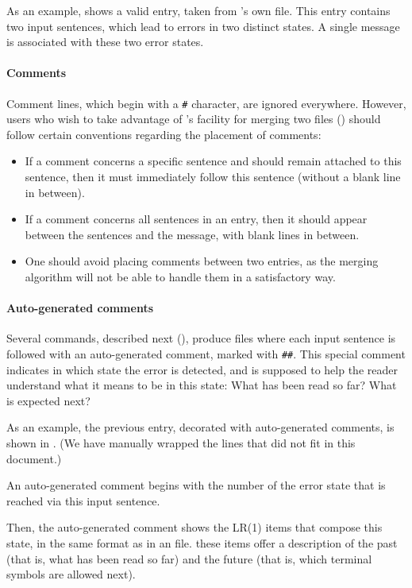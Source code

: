 \documentclass[onecolumn,11pt,nocopyrightspace,preprint]{sigplanconf}
\begin{document}
As an example,  shows a valid entry, taken
from \menhir's own \messages file. This entry contains two input sentences,
which lead to errors in two distinct states. A single message is associated
with these two error states.

\paragraph{Comments}

Comment lines, which begin with a \verb+#+ character, are ignored everywhere.
However, users who wish to take advantage of \menhir's facility for merging
two \messages files () should follow certain
conventions regarding the placement of comments:
\begin{itemize}
\item If a comment concerns a specific sentence and should remain attached
  to this sentence, then it must immediately follow this sentence
  (without a blank line in between).
\item If a comment concerns all sentences in an entry, then it should appear
  between the sentences and the message, with blank lines in between.
\item One should avoid placing comments between two entries, as the merging
  algorithm will not be able to handle them in a satisfactory way.
\end{itemize}

\paragraph{Auto-generated comments}

Several commands, described next (),
produce \messages files where each input sentence is followed with an
auto-generated comment, marked with \verb+##+. This special comment indicates
in which state the error is detected, and is supposed to help the reader
understand what it means to be in this state: What has been read so far? What
is expected next?

As an example, the previous entry, decorated with auto-generated comments, is
shown in . (We have manually wrapped the
lines that did not fit in this document.)

An auto-generated comment begins with the number of the error state that is
reached via this input sentence.

Then, the auto-generated comment shows the LR(1) items that compose this
state, in the same format as in an \automaton file. these items offer a
description of the past (that is, what has been read so far) and the future
(that is, which terminal symbols are allowed next).
\end{document}
